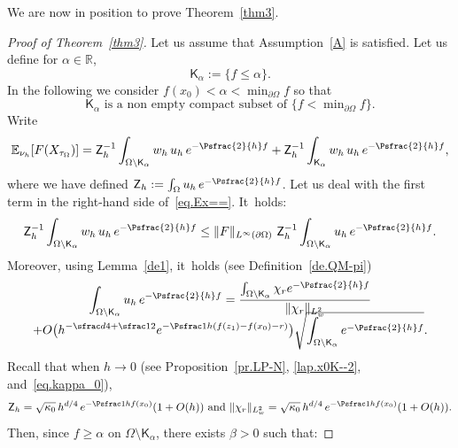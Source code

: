 We are now in position to prove Theorem~\ref{thm3}.

\begin{proof}[Proof of Theorem~\ref{thm3}]
Let us assume that Assumption~\ref{A} is satisfied.
Let us define for $\alpha \in \mathbb R$,\vspace*{-3pt}\enlargethispage{.5\baselineskip}
\[
\mathsf K_{\alpha}:=\{f\le \alpha\}.
\]
In the following we consider $f(x_0)<\alpha < \min_{\partial \Omega}f$ so that\vspace*{-1pt}
\[
\mathsf K_{\alpha} \text{ is a non empty compact subset of } \{f<\min\nolimits_{\partial \Omega}f\}.
\]
Write\vspace*{-3pt}
\begin{equation}\label{eq.Ex==}
\mathbb E_{\nu_h} [F(X_{\tau_{\Omega}})]={\mathsf Z_h^{-1}} \int_{\Omega \setminus \mathsf K_{\alpha}}w_h\,
{u}_h\, e^{-\Psfrac{2}{h}f} + {\mathsf Z_h^{-1}} \int_{\mathsf K_{\alpha}} w_h\, {u}_h\, e^{-\Psfrac{2}{h}f},
\end{equation}
where we have defined $ \mathsf Z_h:=\int_{\Omega }
{u}_h\, e^{-\Psfrac{2}{h}f}$.
Let us deal with the first term in the right-hand side of~\eqref{eq.Ex==}. It~holds:\vspace*{-3pt}
\[
{\mathsf Z_h^{-1}} \int_{\Omega \setminus \mathsf K_{\alpha}}w_h\,
{u}_h\, e^{-\Psfrac{2}{h}f} \le \Vert F\Vert _{L^\infty(\partial \Omega)}\ {\mathsf Z_h^{-1}} \int_{\Omega \setminus \mathsf K_{\alpha}}
{u}_h\, e^{-\Psfrac{2}{h}f}.
\]
Moreover, using Lemma~\ref{de1}, it~holds (see Definition~\ref{de.QM-pi})\vspace*{-5pt}
\begin{multline*}
\int_{\Omega \setminus \mathsf K_{\alpha}}
{u}_h\, e^{-\Psfrac{2}{h}f}=\frac{\int_{\Omega \setminus \mathsf K_{\alpha}} \chi_r e^{-\Psfrac{2}{h}f} }{\Vert \chi_r\Vert_{L^2_w}}\\[-8pt] +O\bigl(h^{-\sfrac d4 +\sfrac 12} e^{-\Psfrac 1h (f(z_1)-f(x_0)-r)} \bigr) \sqrt { \int_{\Omega \setminus \mathsf K_{\alpha}}
e^{-\Psfrac{2}{h}f}}.
\end{multline*}
Recall that when $h\to 0$ (see Proposition~\ref{pr.LP-N}, \eqref{lap.x0K--2}, and~\eqref{eq.kappa_0}),\vspace*{-3pt}
\[
\mathsf Z_h=\sqrt{\kappa_0}\, h^{d/4}\, e^{-\Psfrac 1h f(x_0)}(1+O(h)) \ \text{and} \ \Vert \chi_r\Vert_{L^2_w}=\sqrt{\kappa_0}\, h^{d/4}\, e^{-\Psfrac 1h f(x_0)}(1+O(h)).
\]
Then, since $f\ge \alpha$ on $\Omega \setminus \mathsf K_{\alpha}$, there exists $\beta >0$ such that:\vspace*{-3pt}

\end{proof}
